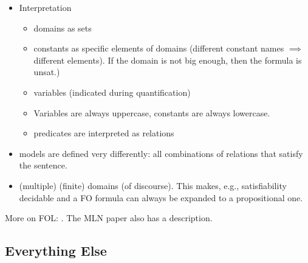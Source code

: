 
\begin{itemize}
  \item Interpretation
        \begin{itemize}
          \item domains as sets
          \item constants as specific elements of domains (different constant
                names $\implies$ different elements). If the domain is not big
                enough, then the formula is unsat.)
          \item variables (indicated during quantification)
          \item Variables are always uppercase, constants are always lowercase.
          \item predicates are interpreted as relations
        \end{itemize}
  \item models are defined very differently: all combinations of relations that
        satisfy the sentence.
  \item (multiple) (finite) domains (of discourse). This makes, e.g.,
        satisfiability decidable and a FO formula can always be expanded to a
        propositional one.
\end{itemize}

More on FOL: \citep{DBLP:books/daglib/0023546}. The MLN paper also has a
description.

\subsection{Everything Else}

